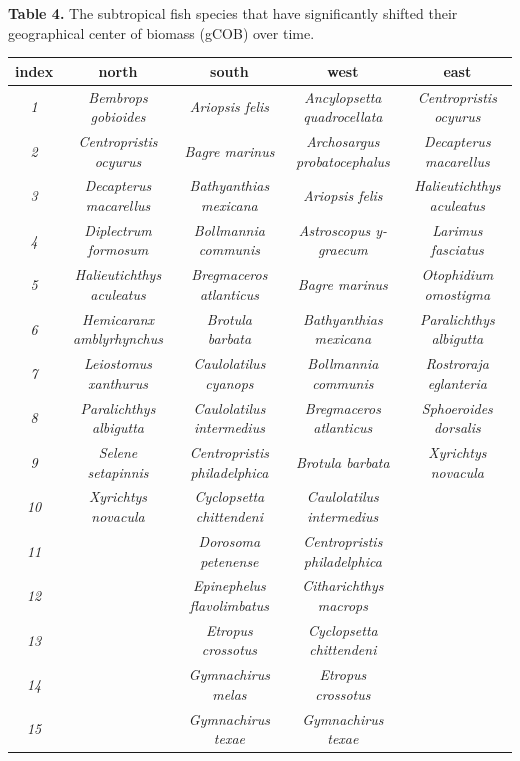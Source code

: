 \documentclass[
  letterpaper,
  DIV=11,
  numbers=noendperiod]{scrartcl}
\begin{document}
\newpage

\textbf{Table 4.} The subtropical fish species that have significantly
shifted their geographical center of biomass (gCOB) over time.

\begin{longtable*}[t]{ccccc}
\toprule
index & north & south & west & east\\
\midrule
\em{1} & \em{Bembrops gobioides} & \em{Ariopsis felis} & \em{Ancylopsetta quadrocellata} & \em{Centropristis ocyurus}\\
\em{2} & \em{Centropristis ocyurus} & \em{Bagre marinus} & \em{Archosargus probatocephalus} & \em{Decapterus macarellus}\\
\em{3} & \em{Decapterus macarellus} & \em{Bathyanthias mexicana} & \em{Ariopsis felis} & \em{Halieutichthys aculeatus}\\
\em{4} & \em{Diplectrum formosum} & \em{Bollmannia communis} & \em{Astroscopus y-graecum} & \em{Larimus fasciatus}\\
\em{5} & \em{Halieutichthys aculeatus} & \em{Bregmaceros atlanticus} & \em{Bagre marinus} & \em{Otophidium omostigma}\\
\addlinespace
\em{6} & \em{Hemicaranx amblyrhynchus} & \em{Brotula barbata} & \em{Bathyanthias mexicana} & \em{Paralichthys albigutta}\\
\em{7} & \em{Leiostomus xanthurus} & \em{Caulolatilus cyanops} & \em{Bollmannia communis} & \em{Rostroraja eglanteria}\\
\em{8} & \em{Paralichthys albigutta} & \em{Caulolatilus intermedius} & \em{Bregmaceros atlanticus} & \em{Sphoeroides dorsalis}\\
\em{9} & \em{Selene setapinnis} & \em{Centropristis philadelphica} & \em{Brotula barbata} & \em{Xyrichtys novacula}\\
\em{10} & \em{Xyrichtys novacula} & \em{Cyclopsetta chittendeni} & \em{Caulolatilus intermedius} & \em{}\\
\addlinespace
\em{11} & \em{} & \em{Dorosoma petenense} & \em{Centropristis philadelphica} & \em{}\\
\em{12} & \em{} & \em{Epinephelus flavolimbatus} & \em{Citharichthys macrops} & \em{}\\
\em{13} & \em{} & \em{Etropus crossotus} & \em{Cyclopsetta chittendeni} & \em{}\\
\em{14} & \em{} & \em{Gymnachirus melas} & \em{Etropus crossotus} & \em{}\\
\em{15} & \em{} & \em{Gymnachirus texae} & \em{Gymnachirus texae} & \em{}\\

\end{longtable*}
\end{document}
